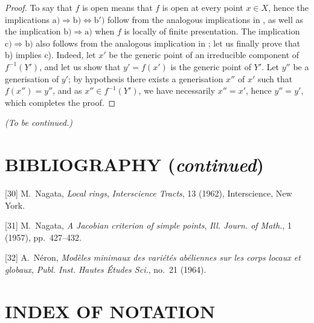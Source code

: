 \begin{proof}
To say that $f$ is open means that $f$ is open at every point $x\in X$, hence the implications $\mathrm{a)}\Rightarrow\mathrm{b)}\Leftrightarrow\mathrm{b')}$ follow from the analogous implications in , as well as the implication $\mathrm{b)}\Rightarrow\mathrm{a)}$ when $f$ is locally of finite presentation.
The implication $\mathrm{c)}\Rightarrow\mathrm{b)}$ also follows from the analogous implication in ; let us finally prove that b) implies c).
Indeed, let $x'$ be the generic point of an irreducible component of $f^{-1}(Y')$, and let us show that $y'=f(x')$ is the generic point of $Y'$.
Let $y''$ be a generisation of $y'$; by hypothesis there exists a generisation $x''$ of $x'$ such that $f(x'')=y''$, and as $x''\in f^{-1}(Y')$, we have necessarily $x''=x'$, hence $y''=y'$, which completes the proof.
\end{proof}

\begin{center}
\emph{(To be continued.)}
\end{center}

\clearpage
{}
{}
\section*{BIBLIOGRAPHY (\emph{continued})}

\begingroup
\small
\setlength{\parindent}{0pt}
\setlength{\parskip}{3pt}
[30] M.~Nagata, \emph{Local rings}, \emph{Interscience Tracts}, 13 (1962),
Interscience, New York.

[31] M.~Nagata, \emph{A Jacobian criterion of simple points},
\emph{Ill. Journ. of Math.}, 1 (1957), pp.~427--432.

[32] A.~Néron, \emph{Modèles minimaux des variétés abéliennes sur les corps
locaux et globaux}, \emph{Publ. Inst. Hautes Études Sci.}, no.~21 (1964).

\clearpage
{}
{}
\section*{INDEX OF NOTATION}


